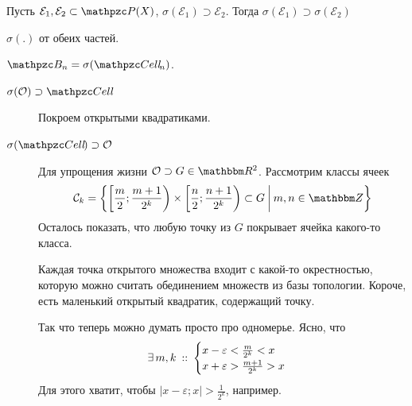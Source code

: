 \documentclass[draft, timbord]{longnotes}
\begin{document}
\begin{lem}\label{lem:meas::setsys::algsubset}
  Пусть $\mathcal E_1, \mathcal E_2 \subset \pset(X)$, $\sigma(\mathcal E_1) \supset \mathcal E_2$.
  Тогда $\sigma(\mathcal E_1) \supset \sigma(\mathcal E_2)$
\end{lem}
\begin{lproof}
  $\sigma(.)$ от обеих частей.
\end{lproof}
\begin{thrm}\label{thrm:meas::setsys::borelcell}
  $\borel_n = \sigma(\Cell_n)$.
\end{thrm}
\begin{tproof}
  \begin{description}
    \item[$\sigma (\open) \supset \Cell$] Покроем открытыми квадратиками.
    \item[$\sigma (\Cell) \supset \open$] Для упрощения жизни $\open \supset G \in \R^2$.
      Рассмотрим классы ячеек
      \[
        \mathcal C_k = \left\{
          \left[\frac m 2; \frac{m+1}{2^k}\right) 
          \times 
          \left[\frac n 2; \frac{n+1}{2^k}\right) \subset G
          \:\middle|\: m,n \in \Z
        \right\}
      \]
      Осталось показать, что любую точку из $G$ покрывает ячейка какого-то класса.
      
      Каждая точка открытого множества входит с какой-то окрестностью, которую можно считать
      обединением множеств из базы топологии. Короче, есть маленький открытый квадратик, 
      содержащий точку. 

      Так что теперь можно думать просто про одномерье.
      Ясно, что \[
        \exists\, m, k \:::\: 
        \begin{cases}
          x-\varepsilon < \frac{m}{2^k} < x \\
          x+ \varepsilon >  \frac{m+1}{2^k} > x \\
        \end{cases}
      \]
      Для этого хватит, чтобы $ |x-\varepsilon ; x| > \frac{1}{2^k}$, например.
  \end{description}
\end{tproof}
\end{document}
